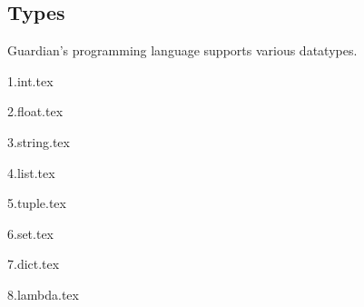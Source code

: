 
\subsection{Types}
{
	Guardian's programming language supports various datatypes.
	
	{1.int.tex}
	
	{2.float.tex}
	
	{3.string.tex}
	
	{4.list.tex}
	
	{5.tuple.tex}
	
	{6.set.tex}
	
	{7.dict.tex}
	
	{8.lambda.tex}
}

